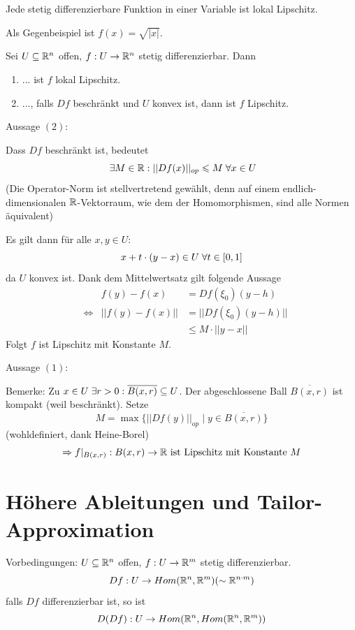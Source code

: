 \documentclass[main.tex]{subfiles}
\begin{document}
\begin{Beispiel}
  Jede stetig differenzierbare Funktion in einer Variable ist lokal Lipschitz.

  Als Gegenbeispiel ist $f(x) = \sqrt{|x|}$.
\end{Beispiel}

\begin{Theorem}
  Sei $U \subseteq \mathbb{R}^n$ offen, $f: U \to \mathbb{R}^n$ stetig differenzierbar. Dann
  \begin{enumerate}
    \item ... ist $f$ lokal Lipschitz.
    \item ..., falls $Df$ beschränkt und $U$ konvex ist, dann ist $f$ Lipschitz.
  \end{enumerate}
\end{Theorem}

\begin{Beweis}
  Aussage $(2)$:

  Dass $Df$ beschränkt ist, bedeutet
  $$\;\exists M \in \mathbb{R}: ||Df(x)||_{op} \leqslant M \;\forall x \in U$$
  (Die Operator-Norm ist stellvertretend gewählt, denn auf einem endlich-dimensionalen $\mathbb{R}$-Vektorraum, wie dem der Homomorphismen, sind alle Normen äquivalent)

  Es gilt dann für alle $x,y \in U$:
  $$x + t \cdot (y - x) \in U \;\forall t \in [0,1]$$
  da $U$ konvex ist. Dank dem Mittelwertsatz gilt folgende Aussage
  $$\begin{aligned}
    & & f(y) - f(x) & = Df(\xi_0)(y-h) \\
    & \Leftrightarrow & ||f(y) - f(x)|| & = ||Df(\xi_0)(y-h)|| \\
    & & & \leq M \cdot ||y - x||
  \end{aligned}$$
  Folgt $f$ ist Lipschitz mit Konstante $M$.

  Aussage $(1)$:

  Bemerke: Zu $x \in U \;\exists r > 0 : \overline{B(x,r)} \subseteq U$. Der abgeschlossene Ball $\overline{B(x,r)}$ ist kompakt (weil beschränkt). Setze
  $$M = \max \{||Df(y)||_{op} \mid y \in \overline{B(x,r)} \}$$
  (wohldefiniert, dank Heine-Borel)
  $$\Rightarrow f|_{B(x,r)} : B(x,r) \to \mathbb{R} \text{ ist Lipschitz mit Konstante } M$$
\end{Beweis}


\section{Höhere Ableitungen und Tailor-Approximation}

Vorbedingungen: $U \subseteq \mathbb{R}^n$ offen, $f: U \to \mathbb{R}^m$ stetig differenzierbar.
$$Df : U \to Hom(\mathbb{R}^n,\mathbb{R}^m) (\sim \mathbb{R}^{n\cdot m})$$
falls $Df$ differenzierbar ist, so ist
$$D(Df) : U \to Hom(\mathbb{R}^n,Hom(\mathbb{R}^n,\mathbb{R}^m))$$
\end{document}
